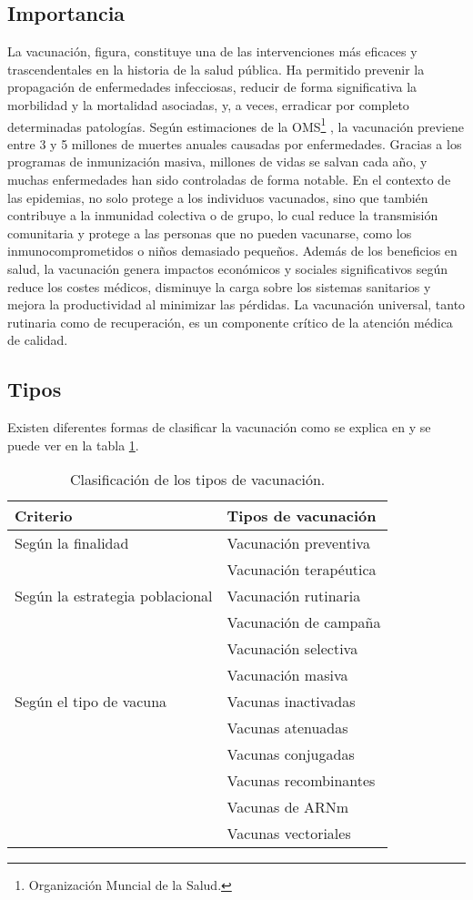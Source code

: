 \subsection{Importancia}
La vacunación, figura, constituye una de las intervenciones más eficaces y trascendentales en la historia de la salud pública. Ha permitido prevenir la propagación de enfermedades infecciosas, reducir de forma significativa la morbilidad y la mortalidad asociadas, y, a veces, erradicar por completo determinadas patologías. Según estimaciones de la OMS\footnote{Organización Muncial de la Salud.} \cite{oms_vacunas}, la vacunación previene entre 3 y 5 millones de muertes anuales causadas por enfermedades. Gracias a los programas de inmunización masiva, millones de vidas se salvan cada año, y muchas enfermedades han sido controladas de forma notable. En el contexto de las epidemias, no solo protege a los individuos vacunados, sino que también contribuye a la inmunidad colectiva o de grupo, lo cual reduce la transmisión comunitaria y protege a las personas que no pueden vacunarse, como los inmunocomprometidos o niños demasiado pequeños. Además de los beneficios en salud, la vacunación genera impactos económicos y sociales significativos según \cite{nandi2020vaccines} reduce los costes médicos, disminuye la carga sobre los sistemas sanitarios y mejora la productividad al minimizar las pérdidas. La vacunación universal, tanto rutinaria como de recuperación, es un componente crítico de la atención médica de calidad.


\subsection{Tipos}
Existen diferentes formas de clasificar la vacunación como se explica en \cite{hhs_vaccines} y se puede ver en la tabla \ref{tab:tipos_vacunacion}.

\begin{table}[H]
\centering
\caption{Clasificación de los tipos de vacunación.}
\label{tab:tipos_vacunacion}
\begin{tabularx}{\textwidth}{|l|X|}
\hline
\textbf{Criterio} & \textbf{Tipos de vacunación} \\
\hline
Según la finalidad &
Vacunación preventiva \\
& Vacunación terapéutica \\
\hline
Según la estrategia poblacional &
Vacunación rutinaria \\
& Vacunación de campaña \\
& Vacunación selectiva \\
& Vacunación masiva \\
\hline
Según el tipo de vacuna &
Vacunas inactivadas \\
& Vacunas atenuadas \\
& Vacunas conjugadas \\
& Vacunas recombinantes \\
& Vacunas de ARNm \\
& Vacunas vectoriales \\
\hline
\end{tabularx}
\end{table}


